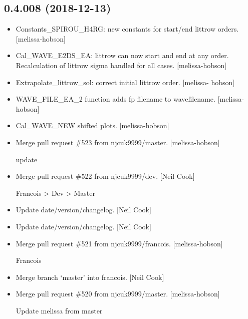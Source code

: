 \documentclass[a4paper,10pt,english]{report}
\begin{document}
\subsection{0.4.008 (2018-12-13)}
\label{\detokenize{misc/changelog:id234}}\begin{itemize}
\item {} 
Constants\_SPIROU\_H4RG: new constants for start/end littrow orders.
{[}melissa-hobson{]}

\item {} 
Cal\_WAVE\_E2DS\_EA: littrow can now start and end at any order.
Recalculation of littrow sigma handled for all cases. {[}melissa-hobson{]}

\item {} 
Extrapolate\_littrow\_sol: correct initial littrow order. {[}melissa-
hobson{]}

\item {} 
WAVE\_FILE\_EA\_2 function adds fp filename to wavefilename. {[}melissa-
hobson{]}

\item {} 
Cal\_WAVE\_NEW shifted plots. {[}melissa-hobson{]}

\item {} 
Merge pull request \#523 from njcuk9999/master. {[}melissa-hobson{]}

update

\item {} 
Merge pull request \#522 from njcuk9999/dev. {[}Neil Cook{]}

Francois \textendash{}\textgreater{} Dev \textendash{}\textgreater{} Master

\item {} 
Update date/version/changelog. {[}Neil Cook{]}

\item {} 
Update date/version/changelog. {[}Neil Cook{]}

\item {} 
Merge pull request \#521 from njcuk9999/francois. {[}melissa-hobson{]}

Francois

\item {} 
Merge branch ‘master’ into francois. {[}Neil Cook{]}

\item {} 
Merge pull request \#520 from njcuk9999/master. {[}melissa-hobson{]}

Update melissa from master

\end{itemize}
\end{document}
